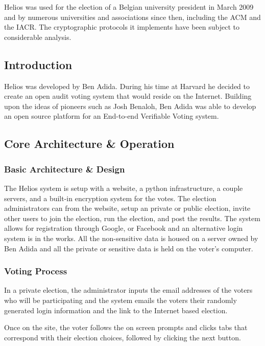 Helios was used for the election of a Belgian university president in
March 2009 and by numerous universities and associations since then,
including the ACM and the IACR. The cryptographic protocols it
implements have been subject to considerable analysis.


\subsection{Introduction}

Helios was developed by Ben Adida. During his time at Harvard he
decided to create an open audit voting system that would reside on the
Internet. Building upon the ideas of pioneers such as Josh Benaloh,
Ben Adida was able to develop an open source platform for an
End-to-end Verifiable Voting system.

\subsection{Core Architecture \& Operation}

\subsubsection{Basic Architecture \& Design}

The Helios system is setup with a website, a python infrastructure, a
couple servers, and a built-in encryption system for the votes. The
election administrators can from the website, setup an private or
public election, invite other users to join the election, run the
election, and post the results. The system allows for registration
through Google, or Facebook and an alternative login system is in the
works. All the non-sensitive data is housed on a server owned by Ben
Adida and all the private or sensitive data is held on the voter's
computer.

\subsubsection{Voting Process}

In a private election, the administrator inputs the email addresses of
the voters who will be participating and the system emails the voters
their randomly generated login information and the link to the
Internet based election.

Once on the site, the voter follows the on screen prompts and clicks
tabs that correspond with their election choices, followed by clicking
the next button.

